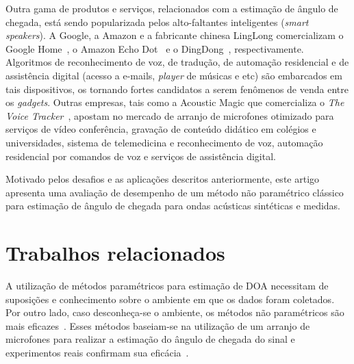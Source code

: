 \documentclass{sbrt2017port}
\begin{document}
Outra gama de produtos e serviços, relacionados com a estimação de ângulo de chegada, está sendo popularizada pelos alto-faltantes inteligentes (\textit{smart speakers}). A Google, a Amazon e a fabricante chinesa LingLong comercializam o Google Home~\cite{web_google_home}, o Amazon Echo Dot~\cite{book_echo_dot_Wright_2016} e o DingDong~\cite{web_dingdong}, respectivamente. Algoritmos de reconhecimento de voz, de tradução, de automação residencial e de assistência digital (acesso a e-mails, \textit{player} de músicas e etc) são embarcados em tais dispositivos, os tornando fortes candidatos a serem fenômenos de venda entre os \textit{gadgets}. Outras empresas, tais como a Acoustic Magic que comercializa o \textit{The Voice Tracker}\texttrademark~\cite{web_acusticMagic}, apostam no mercado de arranjo de microfones otimizado para serviços de vídeo conferência, gravação de conteúdo didático em colégios e universidades, sistema de telemedicina e reconhecimento de voz, automação residencial por comandos de voz e serviços de assistência digital.

Motivado pelos desafios e as aplicações descritos anteriormente, este artigo apresenta uma avaliação de desempenho de um método não paramétrico clássico para estimação de ângulo de chegada para ondas acústicas sintéticas e medidas.


\section{Trabalhos relacionados}
\label{sec_rel_works}
A utilização de métodos paramétricos para estimação de DOA necessitam de suposições e conhecimento sobre o ambiente em que os dados foram coletados. Por outro lado, caso desconheça-se o ambiente, os métodos não paramétricos são mais eficazes~\cite{Wael2015WidebandRadio}. Esses métodos baseiam-se na utilização de um arranjo de microfones para realizar a estimação do ângulo de chegada do sinal e experimentos reais confirmam sua eficácia~\cite{Sun2016ExperimentalArray,Li2017TheEstimation}.
\end{document}
